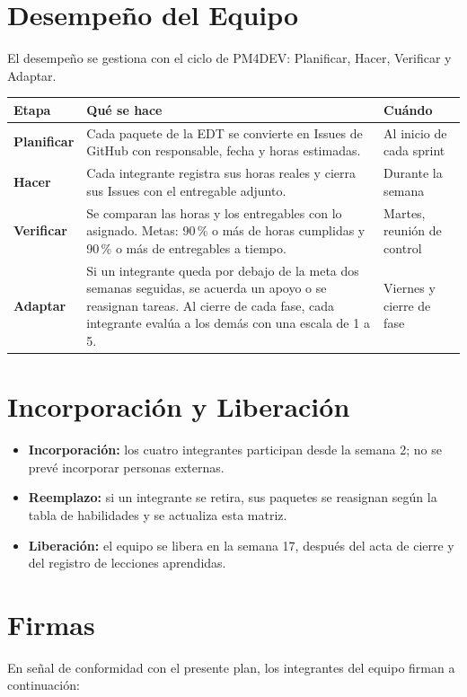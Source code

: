 \documentclass[11pt,a4paper]{article}
\begin{document}
\section{Desempeño del Equipo}
El desempeño se gestiona con el ciclo de PM4DEV: Planificar, Hacer, Verificar y Adaptar.

\vspace{0.1cm}
{\small
{}
\noindent\begin{tabularx}{\textwidth}{@{}P{2.4cm} L P{2.9cm}@{}}
\toprule
{}
\textbf{Etapa} & \textbf{Qué se hace} & \textbf{Cuándo} \\
\midrule
\textbf{Planificar} & Cada paquete de la EDT se convierte en Issues de GitHub con responsable, fecha y horas estimadas. & Al inicio de cada sprint \\
\textbf{Hacer} & Cada integrante registra sus horas reales y cierra sus Issues con el entregable adjunto. & Durante la semana \\
\textbf{Verificar} & Se comparan las horas y los entregables con lo asignado. Metas: 90\,\% o más de horas cumplidas y 90\,\% o más de entregables a tiempo. & Martes, reunión de control \\
\textbf{Adaptar} & Si un integrante queda por debajo de la meta dos semanas seguidas, se acuerda un apoyo o se reasignan tareas. Al cierre de cada fase, cada integrante evalúa a los demás con una escala de 1 a 5. & Viernes y cierre de fase \\
\bottomrule
\end{tabularx}
}

\section{Incorporación y Liberación}
\begin{itemize}[leftmargin=*]
    \item \textbf{Incorporación:} los cuatro integrantes participan desde la semana 2; no se prevé incorporar personas externas.
    \item \textbf{Reemplazo:} si un integrante se retira, sus paquetes se reasignan según la tabla de habilidades y se actualiza esta matriz.
    \item \textbf{Liberación:} el equipo se libera en la semana 17, después del acta de cierre y del registro de lecciones aprendidas.
\end{itemize}

\section{Firmas}
\noindent En señal de conformidad con el presente plan, los integrantes del equipo firman a continuación:
\end{document}
